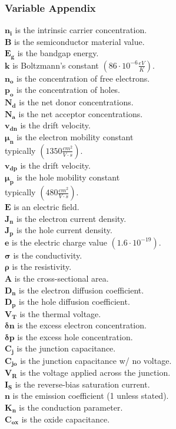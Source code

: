 \documentclass[landscape, 12pt]{report}
\begin{document}
\begin{multicols*}{3}
\subsubsection*{Variable Appendix}
$\boldsymbol{n_i}$ is the intrinsic carrier concentration.\\
$\boldsymbol{B}$ is the semiconductor material value. \\
$\boldsymbol{E_g}$ is the bandgap energy.\\
$\boldsymbol{k}$ is Boltzmann’s constant
$(86 \cdot 10^{-6} \frac{eV}{K})$.\\
$\boldsymbol{n_o}$ is the concentration of free electrons.\\
$\boldsymbol{p_o}$ is the concentration of holes.\\
$\boldsymbol{N_d}$ is the net donor concentrations.\\
$\boldsymbol{N_a}$ is the net acceptor concentrations.\\
$\boldsymbol{v_{dn}}$ is the drift velocity.\\
$\boldsymbol{\mu_n}$ is the electron mobility constant\\ typically  $(1350\frac{cm^2}{V\cdot s})$.\\
$\boldsymbol{v_{dp}}$ is the drift velocity.\\
$\boldsymbol{\mu_p}$ is the hole mobility constant\\ typically $(480\frac{cm^2}{V\cdot s})$.\\
$\boldsymbol{E}$ is an electric field.\\
$\boldsymbol{J_n}$ is the electron current density.\\
$\boldsymbol{J_p}$ is the hole current density.\\
$\boldsymbol{e}$ is the electric charge value $(1.6\cdot10^{-19})$.\\
$\boldsymbol{\sigma}$ is the conductivity.\\
$\boldsymbol{\rho}$ is the resistivity.\\
$\boldsymbol{A}$ is the cross-sectional area.\\
$\boldsymbol{D_n}$ is the electron diffusion coefficient.\\
$\boldsymbol{D_p}$ is the hole diffusion coefficient.\\
$\boldsymbol{V_T}$ is the thermal voltage.\\
$\boldsymbol{\delta n }$ is the excess electron concentration.\\
$\boldsymbol{\delta p }$ is the excess hole concentration.\\
$\boldsymbol{C_j}$ is the junction capacitance.\\
$\boldsymbol{C_{jo}}$ is the junction capacitance w/ no voltage.\\
$\boldsymbol{V_{R}}$ is the voltage applied across the junction.\\
$\boldsymbol{I_{S}}$ is the reverse-bias saturation current.\\
$\boldsymbol{n}$ is the emission coefficient (1 unless stated).\\
$\boldsymbol{K_n}$ is the conduction parameter.\\
$\boldsymbol{C_{ox}}$ is the oxide capacitance.\\
\end{multicols*}
\end{document}
